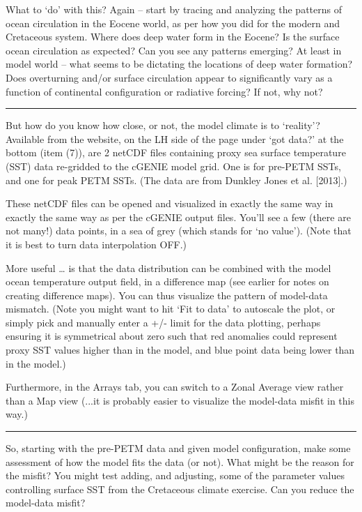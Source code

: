 \documentclass[11pt,fleqn]{book} %
\begin{document}
\noindent What to ‘do’ with this? Again – start by tracing and analyzing the patterns of ocean circulation in the Eocene world, as per how you did for the modern and Cretaceous system. Where does deep water form in the Eocene? Is the surface ocean circulation as expected?
Can you see any patterns emerging? At least in model world – what seems to be dictating the locations of deep water formation? Does overturning and/or surface circulation appear to significantly vary as a function of continental configuration or radiative forcing? If not, why not?

\vspace{1mm}
\noindent\rule{4cm}{0.1mm}
\vspace{2mm}

\noindent But how do you know how close, or not, the model climate is to ‘reality’? 
Available from the website, on the LH side of the page under ‘got data?’ at the bottom (item (7)), are 2 netCDF files containing proxy sea surface temperature (SST) data re-gridded to the cGENIE model grid. One is for pre-PETM SSTs, and one for peak PETM SSTs. (The data are from Dunkley Jones et al. [2013].)

These netCDF files can be opened and visualized in exactly the same way in exactly the same way as per the cGENIE output files. You’ll see a few (there are not many!) data points, in a sea of grey (which stands for ‘no value’). (Note that it is best to turn data interpolation OFF.)

More useful … is that the data distribution can be combined with the model ocean temperature output field, in a difference map (see earlier for notes on creating difference maps). You can thus visualize the pattern of model-data mismatch. (Note you might want to hit ‘Fit to data’ to autoscale the plot, or simply pick and manually enter a +/- limit for the data plotting, perhaps ensuring it is symmetrical about zero such that red anomalies could represent proxy SST values higher than in the model, and blue point data being lower than in the model.)

Furthermore, in the Arrays tab, you can switch to a Zonal Average view rather than a Map view (...it is probably easier to visualize the model-data misfit in this way.)

\vspace{1mm}
\noindent\rule{4cm}{0.1mm}
\vspace{2mm}

\noindent So, starting with the pre-PETM data and given model configuration, make some assessment of how the model fits the data (or not). What might be the reason for the misfit? You might test adding, and adjusting, some of the parameter values controlling surface SST from the Cretaceous climate exercise. Can you reduce the model-data misfit?
\end{document}

